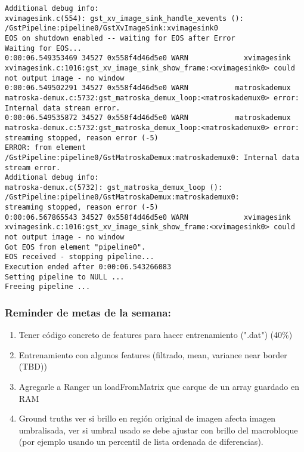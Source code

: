 \documentclass[12pt,oneside]{book}
\begin{document}
\begin{lstlisting}
Additional debug info:
xvimagesink.c(554): gst_xv_image_sink_handle_xevents (): /GstPipeline:pipeline0/GstXvImageSink:xvimagesink0
EOS on shutdown enabled -- waiting for EOS after Error
Waiting for EOS...
0:00:06.549353469 34527 0x558f4d46d5e0 WARN             xvimagesink xvimagesink.c:1016:gst_xv_image_sink_show_frame:<xvimagesink0> could not output image - no window
0:00:06.549502291 34527 0x558f4d46d5e0 WARN           matroskademux matroska-demux.c:5732:gst_matroska_demux_loop:<matroskademux0> error: Internal data stream error.
0:00:06.549535872 34527 0x558f4d46d5e0 WARN           matroskademux matroska-demux.c:5732:gst_matroska_demux_loop:<matroskademux0> error: streaming stopped, reason error (-5)
ERROR: from element /GstPipeline:pipeline0/GstMatroskaDemux:matroskademux0: Internal data stream error.
Additional debug info:
matroska-demux.c(5732): gst_matroska_demux_loop (): /GstPipeline:pipeline0/GstMatroskaDemux:matroskademux0:
streaming stopped, reason error (-5)
0:00:06.567865543 34527 0x558f4d46d5e0 WARN             xvimagesink xvimagesink.c:1016:gst_xv_image_sink_show_frame:<xvimagesink0> could not output image - no window
Got EOS from element "pipeline0".
EOS received - stopping pipeline...
Execution ended after 0:00:06.543266083
Setting pipeline to NULL ...
Freeing pipeline ...
\end{lstlisting}

  \subsubsection*{Reminder de metas de la semana:}
  \begin{enumerate}
    \item Tener código concreto de features para hacer entrenamiento (".dat") (40\%)
    \item Entrenamiento con algunos features (filtrado, mean, variance near border (TBD))
    \item Agregarle a Ranger un loadFromMatrix que carque de un array guardado en RAM
    \item Ground truths ver si brillo en región original de imagen afecta imagen umbralisada, ver si umbral usado se debe ajustar con brillo del macrobloque (por ejemplo usando un percentil de lista ordenada de diferencias).
  \end{enumerate}
\end{document}
